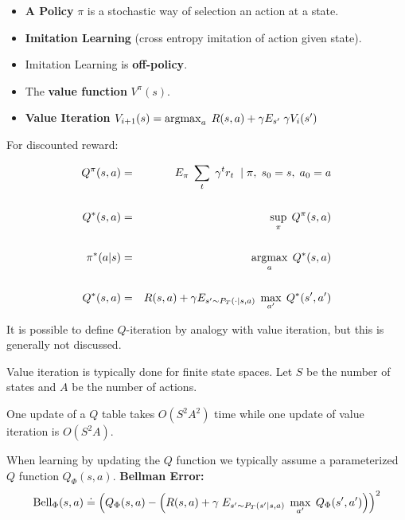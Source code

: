 {

\begin{itemize}
\item {\bf A Policy} $\pi$ is a stochastic way of selection an action at a state.

\vfill
\item {\bf Imitation Learning} (cross entropy imitation of action given state).

\vfill
\item Imitation Learning is {\bf off-policy}.

\vfill
\item The {\bf value function} $V^\pi(s)$.

\vfill
\item {\bf Value Iteration} $V_{i+1}(s) = \operatorname*{argmax}_a\;R(s,a) + \gamma E_{s'}\;\gamma V_i(s')$
\end{itemize}


For discounted reward:

\begin{eqnarray*}
  Q^\pi(s,a) & = & E_\pi\;\sum_t \;\gamma^tr_t \;\;|\; \pi, \; s_0 = s,\;a_0 = a \\
  \\
  Q^*(s,a) & = & \sup_\pi \;Q^\pi(s,a) \\
  \\
  \pi^*(a|s) & = & \operatorname*{argmax}_a\;Q^*(s,a) \\
  \\
  Q^*(s,a) & = & R(s,a) + \gamma E_{s' \sim P_T(\cdot|s,a)}\;\max_{a'}\; Q^*(s',a')
\end{eqnarray*}


It is possible to define $Q$-iteration by analogy with value iteration, but this is generally not discussed.

\vfill
Value iteration is typically done for finite state spaces.  Let $S$ be the number of states and $A$ be the number of actions.

\vfill
One update of a $Q$ table takes $O(S^2A^2)$ time while one update of value iteration is $O(S^2A)$.


When learning by updating the $Q$ function we typically assume a parameterized $Q$ function $Q_\Phi(s,a)$.
\vfill
{\bf Bellman Error:}
{\huge $$\mathrm{Bell}_\Phi(s,a) \doteq \left(Q_\Phi(s,a) - \left(R(s,a) + \gamma\;E_{s' \sim P_T(s'|s,a)}\;\max_{a'}\;Q_\Phi(s',a')\right)\right)^2$$}

}
